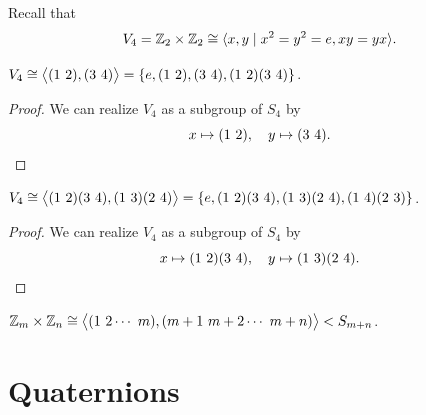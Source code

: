 Recall that \[
  V_4 = \mathbb{Z}_2\times\mathbb{Z}_2 \cong \langle x,y \mid x^2 = y^2 = e, xy = yx\rangle.
\]
\begin{example}
  \(V_4 \cong \big\langle(1\ 2),(3\ 4)\big\rangle = \{e,(1\ 2),(3\ 4),(1\ 2)(3\ 4)\}\).
\end{example}
\begin{proof}
  We can realize \(V_4\) as a subgroup of \(S_4\) by \[
    x \mapsto (1\ 2), \quad
    y \mapsto (3\ 4). \qedhere
  \]
\end{proof}

\begin{example}
  \(V_4 \cong \big\<(1\ 2)(3\ 4),(1\ 3)(2\ 4)\big\> = \{e,(1\ 2)(3\ 4),(1\ 3)(2\ 4),(1\ 4)(2\ 3)\}\).
\end{example}
\begin{proof}
  We can realize \(V_4\) as a subgroup of \(S_4\) by \[
    x \mapsto (1\ 2)(3\ 4), \quad
    y \mapsto (1\ 3)(2\ 4). \qedhere
  \]
\end{proof}

\begin{example}
  \(\Z_m\times\Z_n \cong \big\<(1\ 2\cdots\ m),(m+1\ m+2\cdots\ m+n)\big\> < S_{m+n}\).
\end{example}

\section{Quaternions}
